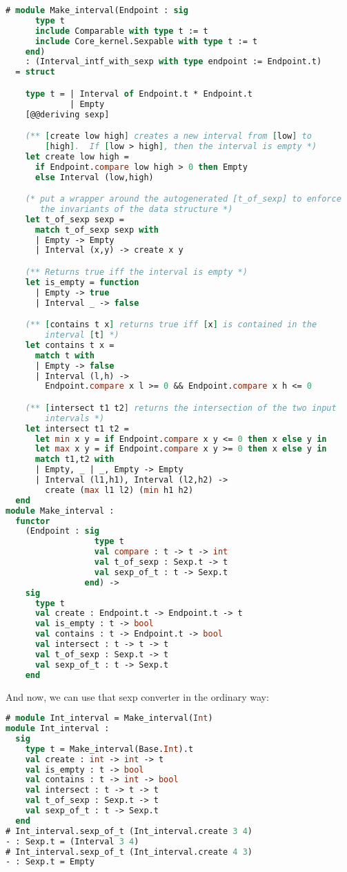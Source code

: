 \begin{lstlisting}[language=Caml]
# module Make_interval(Endpoint : sig
      type t
      include Comparable with type t := t
      include Core_kernel.Sexpable with type t := t
    end)
    : (Interval_intf_with_sexp with type endpoint := Endpoint.t)
  = struct

    type t = | Interval of Endpoint.t * Endpoint.t
             | Empty
    [@@deriving sexp]

    (** [create low high] creates a new interval from [low] to
        [high].  If [low > high], then the interval is empty *)
    let create low high =
      if Endpoint.compare low high > 0 then Empty
      else Interval (low,high)

    (* put a wrapper around the autogenerated [t_of_sexp] to enforce
       the invariants of the data structure *)
    let t_of_sexp sexp =
      match t_of_sexp sexp with
      | Empty -> Empty
      | Interval (x,y) -> create x y

    (** Returns true iff the interval is empty *)
    let is_empty = function
      | Empty -> true
      | Interval _ -> false

    (** [contains t x] returns true iff [x] is contained in the
        interval [t] *)
    let contains t x =
      match t with
      | Empty -> false
      | Interval (l,h) ->
        Endpoint.compare x l >= 0 && Endpoint.compare x h <= 0

    (** [intersect t1 t2] returns the intersection of the two input
        intervals *)
    let intersect t1 t2 =
      let min x y = if Endpoint.compare x y <= 0 then x else y in
      let max x y = if Endpoint.compare x y >= 0 then x else y in
      match t1,t2 with
      | Empty, _ | _, Empty -> Empty
      | Interval (l1,h1), Interval (l2,h2) ->
        create (max l1 l2) (min h1 h2)
  end
module Make_interval :
  functor
    (Endpoint : sig
                  type t
                  val compare : t -> t -> int
                  val t_of_sexp : Sexp.t -> t
                  val sexp_of_t : t -> Sexp.t
                end) ->
    sig
      type t
      val create : Endpoint.t -> Endpoint.t -> t
      val is_empty : t -> bool
      val contains : t -> Endpoint.t -> bool
      val intersect : t -> t -> t
      val t_of_sexp : Sexp.t -> t
      val sexp_of_t : t -> Sexp.t
    end
\end{lstlisting}

And now, we can use that sexp converter in the ordinary way:

\begin{lstlisting}[language=Caml]
# module Int_interval = Make_interval(Int)
module Int_interval :
  sig
    type t = Make_interval(Base.Int).t
    val create : int -> int -> t
    val is_empty : t -> bool
    val contains : t -> int -> bool
    val intersect : t -> t -> t
    val t_of_sexp : Sexp.t -> t
    val sexp_of_t : t -> Sexp.t
  end
# Int_interval.sexp_of_t (Int_interval.create 3 4)
- : Sexp.t = (Interval 3 4)
# Int_interval.sexp_of_t (Int_interval.create 4 3)
- : Sexp.t = Empty
\end{lstlisting}

